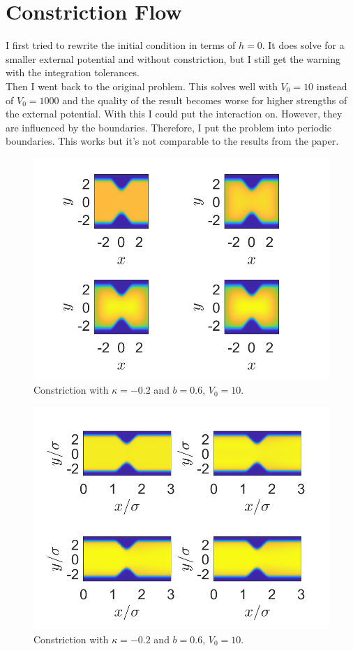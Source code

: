 \documentclass[11pt, a4paper]{article}
\theoremstyle{definition}
\begin{document}
\section{Constriction Flow}
I first tried to rewrite the initial condition in terms of $h = 0$. It does solve for a smaller external potential and without constriction, but I still get the warning with the integration tolerances. \\

Then I went back to the original problem. This solves well with $V_0 = 10$ instead of $V_0 = 1000$ and the quality of the result becomes worse for higher strengths of the external potential. 
With this I could put the interaction on. However, they are influenced by the boundaries. Therefore, I put the problem into periodic boundaries. This works but it's not comparable to the results from the paper.
\begin{figure}[h]
	\centering
	\includegraphics[scale=0.6]{Con1.png}
	\caption{Constriction with $\kappa = -0.2$ and $b = 0.6$, $V_0 = 10$.} 
	\label{F2}
\end{figure}

\begin{figure}[h]
	\centering
	\includegraphics[scale=0.6]{Con2.png}
	\caption{Constriction with $\kappa = -0.2$ and $b = 0.6$, $V_0 = 10$.} 
	\label{F3}
\end{figure}
\end{document}
